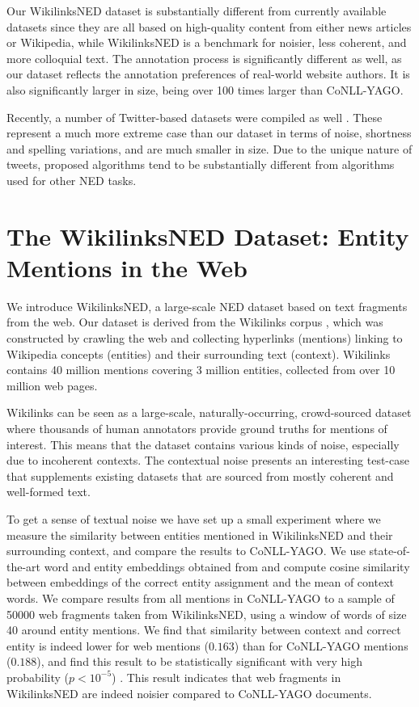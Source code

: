 \documentclass[11pt,a4paper]{article}
\begin{document}
	Our WikilinksNED dataset is substantially different from currently available datasets since they are all based on high-quality content from either news articles or Wikipedia, while WikilinksNED is a benchmark for noisier, less coherent, and more colloquial text. The annotation process is significantly different as well, as our dataset reflects the annotation preferences of real-world website authors. It is also significantly larger in size, being over 100 times larger than CoNLL-YAGO.
	
	Recently, a number of Twitter-based datasets were compiled as well \cite{Meij202Adding,fromreide2014crowdsourcing}. These represent a much more extreme case than our dataset in terms of noise, shortness and spelling variations, and are much smaller in size. Due to the unique nature of tweets, proposed algorithms tend to be substantially different from algorithms used for other NED tasks.
	
	\section{The WikilinksNED Dataset: \qquad\qquad Entity Mentions in the Web}
	\label{sec:w}
	
	We introduce WikilinksNED, a large-scale NED dataset based on text fragments from the web. Our dataset is derived from the Wikilinks corpus \cite{singh12:wiki-links}, which was constructed by crawling the web and collecting hyperlinks (mentions) linking to Wikipedia concepts (entities) and their surrounding text (context). Wikilinks contains 40 million mentions covering 3 million entities, collected from over 10 million web pages. 
	
	Wikilinks can be seen as a large-scale, naturally-occurring, crowd-sourced dataset where thousands of human annotators provide ground truths for mentions of interest. This means that the dataset contains various kinds of noise, especially due to incoherent contexts. The contextual noise presents an interesting test-case that supplements existing datasets that are sourced from mostly coherent and well-formed text. 
	
	To get a sense of textual noise we have set up a small experiment where we measure the similarity between entities mentioned in WikilinksNED and their surrounding context, and compare the results to CoNLL-YAGO. We use state-of-the-art word and entity embeddings obtained from  and compute cosine similarity between embeddings of the correct entity assignment and the mean of context words. We compare results from all mentions in CoNLL-YAGO to a sample of 50000 web fragments taken from WikilinksNED, using a window of words of size 40 around entity mentions. We find that similarity between context and correct entity is indeed lower for web mentions ($0.163$) than for CoNLL-YAGO mentions ($0.188$), and find this result to be statistically significant with very high probability ($p<10^{-5}$) . This result indicates that web fragments in WikilinksNED are indeed noisier compared to CoNLL-YAGO documents.
	
\end{document}
